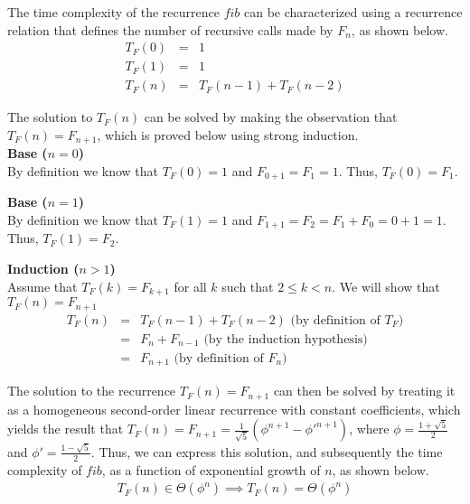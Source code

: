 \documentclass[11pt]{article}
\begin{document}
\begin{prob}{1}
\end{prob}
\begin{sol} 

The time complexity of the recurrence $fib$ can be characterized using a recurrence relation that defines the number of recursive calls made by $F_{n}$, as shown below.
\begin{eqnarray*}
T_{F}(0) & = & 1 \\
T_{F}(1) & = & 1 \\
T_{F}(n) & = & T_{F}(n-1) + T_{F}(n-2)
\end{eqnarray*}

The solution to $T_{F}(n)$ can be solved by making the observation that $T_{F}(n) = F_{n+1}$, which is proved below using strong induction.\\

\textbf{Base ($n = 0$)} \\
By definition we know that $T_{F}(0) = 1$ and $F_{0 + 1} = F_{1} = 1$. Thus, $T_{F}(0) = F_{1}$.

\textbf{Base ($n = 1$)} \\
By definition we know that $T_{F}(1) = 1$ and $F_{1 + 1} = F_{2} = F_{1} + F_{0} = 0 + 1 = 1$. Thus, $T_{F}(1) = F_{2}$.

\textbf{Induction ($n > 1$)} \\
Assume that $T_{F}(k) = F_{k + 1}$ for all $k$ such that $2 \leq k < n$. We will show that $T_{F}(n) = F_{n + 1}$
\begin{eqnarray*}
T_{F}(n) & = & T_{F}(n - 1) + T_{F}(n - 2) \text{ (by definition of $T_{F}$)} \\
& = & F_{n} + F_{n - 1} \text{ (by the induction hypothesis)} \\
& = & F_{n + 1} \text{ (by definition of $F_{n}$) }
\end{eqnarray*}

The solution to the recurrence $T_{F}(n) = F_{n+1}$ can then be solved by treating it as a homogeneous second-order linear recurrence with constant coefficients, which yields the result that $T_{F}(n) = F_{n+1} = \frac{1}{\sqrt{5}}(\phi^{n+1} - \phi'^{n+1})$, where $\phi = \frac{1 + \sqrt{5}}{2}$ and $\phi' = \frac{1 - \sqrt{5}}{2}$. Thus, we can express this solution, and subsequently the time complexity of $fib$, as a function of exponential growth of $n$, as shown below. 
\begin{eqnarray*}
T_{F}(n) \in \Theta(\phi^{n}) \implies T_{F}(n) = \Theta(\phi^{n})
\end{eqnarray*}


\end{sol}
\end{document}
